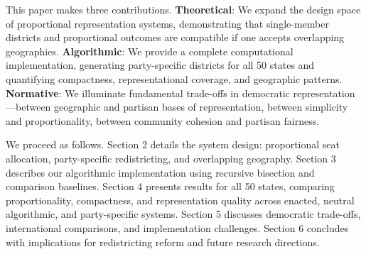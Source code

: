 This paper makes three contributions. \textbf{Theoretical}: We expand the design space of proportional representation systems, demonstrating that single-member districts and proportional outcomes are compatible if one accepts overlapping geographies. \textbf{Algorithmic}: We provide a complete computational implementation, generating party-specific districts for all 50 states and quantifying compactness, representational coverage, and geographic patterns. \textbf{Normative}: We illuminate fundamental trade-offs in democratic representation—between geographic and partisan bases of representation, between simplicity and proportionality, between community cohesion and partisan fairness.

We proceed as follows. Section 2 details the system design: proportional seat allocation, party-specific redistricting, and overlapping geography. Section 3 describes our algorithmic implementation using recursive bisection and comparison baselines. Section 4 presents results for all 50 states, comparing proportionality, compactness, and representation quality across enacted, neutral algorithmic, and party-specific systems. Section 5 discusses democratic trade-offs, international comparisons, and implementation challenges. Section 6 concludes with implications for redistricting reform and future research directions.

